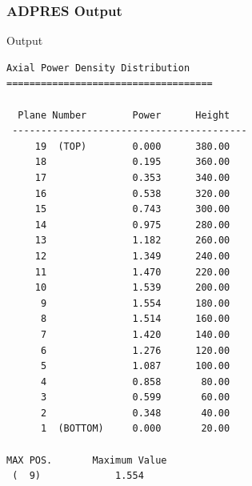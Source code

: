 \documentclass{beamer}
\begin{document}

\begin{frame}[fragile] %
\frametitle{ADPRES Output}
\begin{block}{Output}
\begin{Verbatim}[fontsize=\tiny]
  Axial Power Density Distribution
====================================

  Plane Number        Power      Height
 -----------------------------------------
     19  (TOP)        0.000      380.00
     18               0.195      360.00
     17               0.353      340.00
     16               0.538      320.00
     15               0.743      300.00
     14               0.975      280.00
     13               1.182      260.00
     12               1.349      240.00
     11               1.470      220.00
     10               1.539      200.00
      9               1.554      180.00
      8               1.514      160.00
      7               1.420      140.00
      6               1.276      120.00
      5               1.087      100.00
      4               0.858       80.00
      3               0.599       60.00
      2               0.348       40.00
      1  (BOTTOM)     0.000       20.00

MAX POS.       Maximum Value
 (  9)             1.554
\end{Verbatim}
\end{block}
\end{frame}

\end{document}
